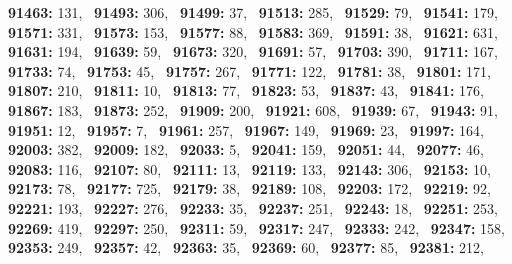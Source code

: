 \textbf{91463:} 131,\allowbreak~ 
\textbf{91493:} 306,\allowbreak~ 
\textbf{91499:} 37,\allowbreak~ 
\textbf{91513:} 285,\allowbreak~ 
\textbf{91529:} 79,\allowbreak~ 
\textbf{91541:} 179,\allowbreak~ 
\textbf{91571:} 331,\allowbreak~ 
\textbf{91573:} 153,\allowbreak~ 
\textbf{91577:} 88,\allowbreak~ 
\textbf{91583:} 369,\allowbreak~ 
\textbf{91591:} 38,\allowbreak~ 
\textbf{91621:} 631,\allowbreak~ 
\textbf{91631:} 194,\allowbreak~ 
\textbf{91639:} 59,\allowbreak~ 
\textbf{91673:} 320,\allowbreak~ 
\textbf{91691:} 57,\allowbreak~ 
\textbf{91703:} 390,\allowbreak~ 
\textbf{91711:} 167,\allowbreak~ 
\textbf{91733:} 74,\allowbreak~ 
\textbf{91753:} 45,\allowbreak~ 
\textbf{91757:} 267,\allowbreak~ 
\textbf{91771:} 122,\allowbreak~ 
\textbf{91781:} 38,\allowbreak~ 
\textbf{91801:} 171,\allowbreak~ 
\textbf{91807:} 210,\allowbreak~ 
\textbf{91811:} 10,\allowbreak~ 
\textbf{91813:} 77,\allowbreak~ 
\textbf{91823:} 53,\allowbreak~ 
\textbf{91837:} 43,\allowbreak~ 
\textbf{91841:} 176,\allowbreak~ 
\textbf{91867:} 183,\allowbreak~ 
\textbf{91873:} 252,\allowbreak~ 
\textbf{91909:} 200,\allowbreak~ 
\textbf{91921:} 608,\allowbreak~ 
\textbf{91939:} 67,\allowbreak~ 
\textbf{91943:} 91,\allowbreak~ 
\textbf{91951:} 12,\allowbreak~ 
\textbf{91957:} 7,\allowbreak~ 
\textbf{91961:} 257,\allowbreak~ 
\textbf{91967:} 149,\allowbreak~ 
\textbf{91969:} 23,\allowbreak~ 
\textbf{91997:} 164,\allowbreak~ 
\textbf{92003:} 382,\allowbreak~ 
\textbf{92009:} 182,\allowbreak~ 
\textbf{92033:} 5,\allowbreak~ 
\textbf{92041:} 159,\allowbreak~ 
\textbf{92051:} 44,\allowbreak~ 
\textbf{92077:} 46,\allowbreak~ 
\textbf{92083:} 116,\allowbreak~ 
\textbf{92107:} 80,\allowbreak~ 
\textbf{92111:} 13,\allowbreak~ 
\textbf{92119:} 133,\allowbreak~ 
\textbf{92143:} 306,\allowbreak~ 
\textbf{92153:} 10,\allowbreak~ 
\textbf{92173:} 78,\allowbreak~ 
\textbf{92177:} 725,\allowbreak~ 
\textbf{92179:} 38,\allowbreak~ 
\textbf{92189:} 108,\allowbreak~ 
\textbf{92203:} 172,\allowbreak~ 
\textbf{92219:} 92,\allowbreak~ 
\textbf{92221:} 193,\allowbreak~ 
\textbf{92227:} 276,\allowbreak~ 
\textbf{92233:} 35,\allowbreak~ 
\textbf{92237:} 251,\allowbreak~ 
\textbf{92243:} 18,\allowbreak~ 
\textbf{92251:} 253,\allowbreak~ 
\textbf{92269:} 419,\allowbreak~ 
\textbf{92297:} 250,\allowbreak~ 
\textbf{92311:} 59,\allowbreak~ 
\textbf{92317:} 247,\allowbreak~ 
\textbf{92333:} 242,\allowbreak~ 
\textbf{92347:} 158,\allowbreak~ 
\textbf{92353:} 249,\allowbreak~ 
\textbf{92357:} 42,\allowbreak~ 
\textbf{92363:} 35,\allowbreak~ 
\textbf{92369:} 60,\allowbreak~ 
\textbf{92377:} 85,\allowbreak~ 
\textbf{92381:} 212,\allowbreak~ 
